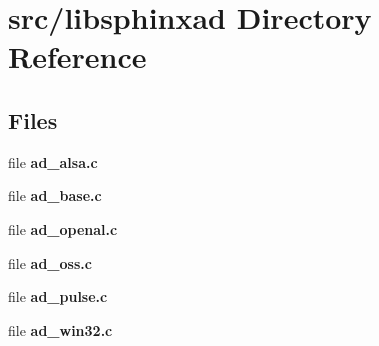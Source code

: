 \section{src/libsphinxad Directory Reference}
\label{dir_6b434913578e1a30215dcd3a2a20216a}
\subsection*{Files}
\begin{DoxyCompactItemize}
\item 
file {\bfseries ad\-\_\-alsa.\-c}
\item 
file {\bfseries ad\-\_\-base.\-c}
\item 
file {\bfseries ad\-\_\-openal.\-c}
\item 
file {\bfseries ad\-\_\-oss.\-c}
\item 
file {\bfseries ad\-\_\-pulse.\-c}
\item 
file {\bfseries ad\-\_\-win32.\-c}
\end{DoxyCompactItemize}
